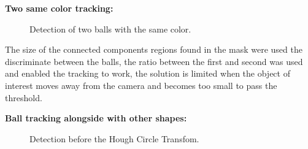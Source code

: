 \documentclass[10pt,twocolumn,letterpaper]{article}
\begin{document}
  \bigbreak
  \textbf{Two same color tracking:}
  \bigbreak

  \begin{figure}[!h]
    \centering
    \setlength{\fboxsep}{1pt}
    \setlength{\fboxrule}{1pt}
    \caption{Detection of two balls with the same color.}
    \label{fig:same_color}
  \end{figure}

  The size of the connected components regions found in the mask were used the
  discriminate between the balls, the ratio between the first and second was
  used and enabled the tracking to work, the solution is limited when the object
  of interest moves away from the camera and becomes too small to pass the
  threshold.

  \bigbreak
  \textbf{Ball tracking alongside with other shapes:}
  \bigbreak

  \begin{figure}[!h]
    \centering
    \setlength{\fboxsep}{1pt}
    \setlength{\fboxrule}{1pt}
    \caption{Detection before the Hough Circle Transfom.}
    \label{fig:not_hough}
  \end{figure}
\end{document}
